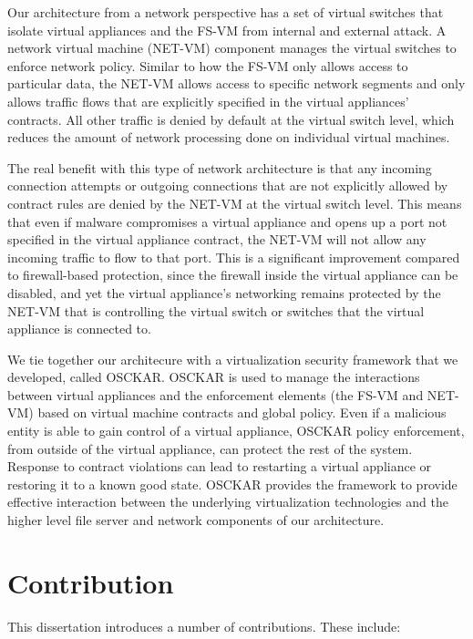 Our architecture from a network perspective has a set of virtual switches that isolate virtual appliances and the FS-VM from internal and external attack. A network virtual machine (NET-VM) component manages the virtual switches to enforce network policy. Similar to how the FS-VM only allows access to particular data, the NET-VM allows access to specific network segments and only allows traffic flows that are explicitly specified in the virtual appliances' contracts. All other traffic is denied by default at the virtual switch level, which reduces the amount of network processing done on individual virtual machines.

The real benefit with this type of network architecture is that any incoming connection attempts or outgoing connections that are not explicitly allowed by contract rules are denied by the NET-VM at the virtual switch level. This means that even if malware compromises a virtual appliance and opens up a port not specified in the virtual appliance contract, the NET-VM will not allow any incoming traffic to flow to that port. This is a significant improvement compared to firewall-based protection, since the firewall inside the virtual appliance can be disabled, and yet the virtual appliance's networking remains protected by the NET-VM that is controlling the virtual switch or switches that the virtual appliance is connected to. 

We tie together our architecure with a virtualization security framework that we developed, called OSCKAR. OSCKAR is used to manage the interactions between virtual appliances and the enforcement elements (the FS-VM and NET-VM) based on virtual machine contracts and global policy. Even if a malicious entity is able to gain control of a virtual appliance, OSCKAR policy enforcement, from outside of the virtual appliance, can protect the rest of the system. Response to contract violations can lead to restarting a virtual appliance or restoring it to a known good state. OSCKAR provides the framework to provide effective interaction between the underlying virtualization technologies and the higher level file server and network components of our architecture.

\section{Contribution}

This dissertation introduces a number of contributions. These include:

